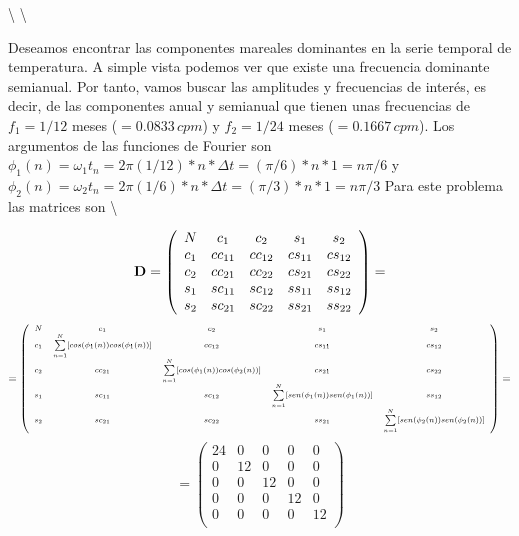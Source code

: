 \documentclass[
]{agujournal2019}
\begin{document}
\textbackslash{} \textbackslash{}

Deseamos encontrar las componentes mareales dominantes en la serie
temporal de temperatura. A simple vista podemos ver que existe una
frecuencia dominante semianual. Por tanto, vamos buscar las amplitudes y
frecuencias de interés, es decir, de las componentes anual y semianual
que tienen unas frecuencias de \(f_1=1/12\) meses (\(=0.0833\,{ cpm}\))
y \(f_2=1/24\) meses (\(=0.1667\,{ cpm}\)). Los argumentos de las
funciones de Fourier son
\(\phi_1(n)=\omega_1 t_n=2\pi(1/12)*n*\Delta t=(\pi/6)*n*1=n\pi/6\) y
\(\phi_2(n)=\omega_2 t_n=2\pi(1/6)*n*\Delta t=(\pi/3)*n*1=n\pi/3\) Para
este problema las matrices son \textbackslash{}

\[{\textbf D}=\left( \begin{array}{ccccc}
  N & c_1 & c_2 & s_1 & s_2 \\
  c_1 & cc_{11} & cc_{12} & cs_{11} & cs_{12}\\
  c_2 & cc_{21} & cc_{22} & cs_{21} & cs_{22} \\
  s_1 & sc_{11} & sc_{12} & ss_{11} & ss_{12} \\
  s_2 & sc_{21} & sc_{22} & ss_{21} & ss_{22} \\
      \end{array} \right)=\] \[=\scriptsize
 \left( \begin{array}{ccccc}
 N & c_1 & c_2 & s_1 & s_2 \\
  c_1 & \sum\limits^N_{n=1}[cos(\phi_1(n))cos(\phi_1(n))] & cc_{12} & cs_{11} & cs_{12}\\
  c_2 & cc_{21} & \sum\limits^N_{n=1}[cos(\phi_1(n))cos(\phi_2(n))] & cs_{21} & cs_{22} \\
  s_1 & sc_{11} & sc_{12} & \sum\limits^N_{n=1}[sen(\phi_1(n))sen(\phi_1(n))] & ss_{12} \\
  s_2 & sc_{21} & sc_{22} & ss_{21} & \sum\limits^N_{n=1}[sen(\phi_2(n))sen(\phi_2(n))] \\
      \end{array} \right) =
      \] \[
=
 \left( \begin{array}{ccccc}
  24 & 0 & 0 & 0 & 0 \\
  0 & 12 & 0 & 0 & 0\\
  0 & 0 & 12 & 0 & 0 \\
  0 & 0 & 0 & 12 & 0 \\
  0 & 0 & 0 & 0 & 12 \\
      \end{array} \right)
\]
\end{document}
